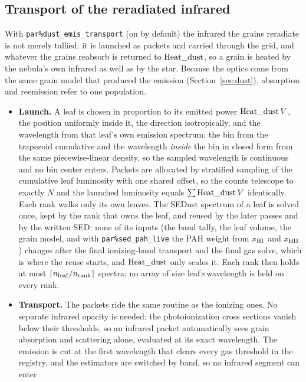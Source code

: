 \documentclass[english,a4paper]{my_memo}
\newcommand{\code}[1]{\texttt{#1}}
\begin{document}
\subsection{Transport of the reradiated infrared}
\label{sec:dustrt}
With \code{par\%dust\_emis\_transport} (on by default) the infrared the
grains reradiate is not merely tallied: it is launched as packets and
carried through the grid, and whatever the grains reabsorb is returned
to ${\rm Heat\_dust}$, so a grain is heated by the nebula's own infrared
as well as by the star.  Because the optics come from the same grain
model that produced the emission (Section~\ref{sec:dust}), absorption
and reemission refer to one population.
\begin{itemize}
\item \textbf{Launch.}  A leaf is chosen in proportion to its emitted
  power ${\rm Heat\_dust}\,V$, the position uniformly inside it, the
  direction isotropically, and the wavelength from that leaf's own
  emission spectrum: the bin from the trapezoid cumulative and the
  wavelength \emph{inside} the bin in closed form from the same
  piecewise-linear density, so the sampled wavelength is continuous and
  no bin center enters.  Packets are allocated by stratified sampling of
  the cumulative leaf luminosity with one shared offset, so the counts
  telescope to exactly $N$ and the launched luminosity equals
  $\sum {\rm Heat\_dust}\,V$ identically.  Each rank walks only its own
  leaves.  The SEDust spectrum of a leaf is solved once, kept by the rank
  that owns the leaf, and reused by the later passes and by the written
  SED: none of its inputs (the band tally, the leaf volume, the grain
  model, and with \code{par\%sed\_pah\_live} the PAH weight from
  $x_{\rm HI}$ and $x_{\rm HII}$) changes after the final ionizing-band
  transport and the final gas solve, which is where the reuse starts, and
  ${\rm Heat\_dust}$ only scales it.  Each rank then holds at most
  $\lceil n_{\rm leaf}/n_{\rm rank}\rceil$ spectra; no array of size
  leaf${\times}$wavelength is held on every rank.
\item \textbf{Transport.}  The packets ride the same routine as the
  ionizing ones.  No separate infrared opacity is needed: the
  photoionization cross sections vanish below their thresholds, so an
  infrared packet automatically sees grain absorption and scattering
  alone, evaluated at its exact wavelength.  The emission is cut at the
  first wavelength that clears every gas threshold in the registry, and
  the estimators are switched by band, so no infrared segment can enter

\end{itemize}
\end{document}
